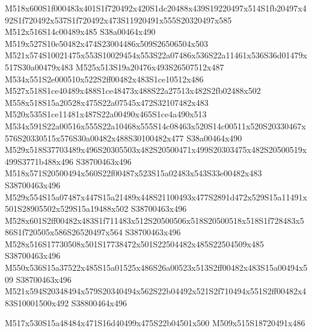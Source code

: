 \documentclass{article}
\begin{document}
\begin{multicols}{2}



M518x600S1f000483x401S1f720492x420S1dc20488x439S19220497x514S1fb20497x492S1f720492x537S1f720492x473S11920491x555S20320497x585 M512x516S14c00489x485 S38a00464x490 M519x527S10e50482x474S23004486x509S26506504x503 M521x574S10021475x553S10029454x553S22a07486x536S22a11461x536S36d01479x517S30a00479x483 M525x513S19a20476x493S26507512x487 M534x551S2e000510x522S2ff00482x483S1ce10512x486 M527x518S1ce40489x488S1ce48473x488S22a27513x482S2fb02488x502 M558x518S15a20528x475S22a07545x472S32107482x483 M520x535S1ce11481x487S22a00490x465S1ce4a490x513 M534x591S22a00516x555S22a10468x555S14c08463x520S14c00511x520S20330467x576S20330515x576S30a00482x488S30100482x477 S38a00464x490 M529x518S37703489x496S20305503x482S20500471x499S20303475x482S20500519x499S3771b488x496 S38700463x496 M518x571S20500494x560S22f00487x523S15a02483x543S33e00482x483 S38700463x496 M529x554S15a07487x447S15a21489x448S21100493x477S2891d472x529S15a11491x501S28905502x529S15a19488x502 S38700463x496 M528x601S2ff00482x483S1f711483x512S20500506x518S20500518x518S1f728483x586S1f720505x586S26520497x564 S38700463x496 M528x516S17730508x501S17738472x501S22504482x485S22504509x485 S38700463x496 M550x536S15a37522x485S15a01525x486S26a00523x513S2ff00482x483S15a00494x509 S38700463x496 M521x594S20348494x579S20340494x562S22b04492x521S2f710494x551S2ff00482x483S10001500x492 S38800464x496





\begin{center}
M517x530S15a48484x471S16d40499x475S22b04501x500 M509x515S18720491x486 
\end{center}



\end{multicols}
\end{document}
